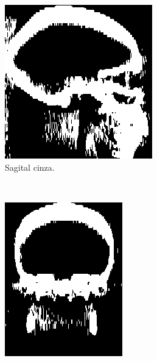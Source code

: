 \documentclass{article}
\begin{document}
\begin{figure}[h]
    \centering
    \begin{subfigure}[b]{0.3\textwidth}
        \includegraphics[width=\textwidth]{skull/_neuroradiologist-sagital-gray.png}
        \caption{Sagital cinza.}
    \end{subfigure}
    ~
    \begin{subfigure}[b]{0.3\textwidth}
        \includegraphics[width=\textwidth]{skull/neuroradiologist-coronal-gray.png}

\end{subfigure}
\end{figure}
\end{document}
